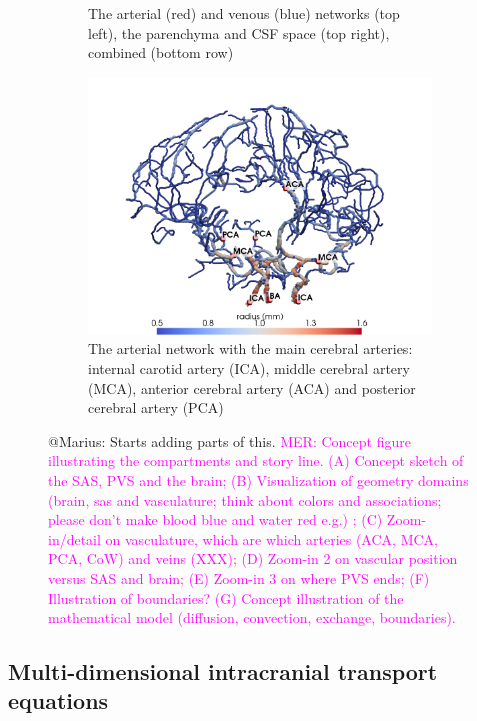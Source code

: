 \documentclass[fleqn,10pt]{wlscirep}
\newcommand{\mer}[1]{\textcolor{magenta}{#1}}
\begin{document}
\begin{figure}
\begin{subfigure}[b]{0.3\textwidth}
         \caption{The arterial (red) and venous (blue) networks (top left), the parenchyma and CSF space (top right), combined (bottom row)}
         \label{fig:three sin x}
     \end{subfigure}
     \hfill
     \begin{subfigure}[b]{0.24\textwidth}
         \centering
         \includegraphics[trim={4cm 0 4cm 0},clip,width=\textwidth]{figures/labeled_arteries.png}
         \caption{The arterial network with the main cerebral arteries: internal carotid artery (ICA), middle cerebral artery (MCA), anterior cerebral artery (ACA) and posterior cerebral artery (PCA)}
         \label{fig:five over x}
     \end{subfigure}
  \caption{@Marius: Starts adding parts of this. \mer{MER: Concept figure illustrating the compartments and story line. (A) Concept sketch of the SAS, PVS and the brain; (B) Visualization of geometry domains (brain, sas and vasculature; think about colors and associations; please don't make blood blue and water red e.g.) ; (C) Zoom-in/detail on vasculature, which are which arteries (ACA, MCA, PCA, CoW)  and veins (XXX); (D) Zoom-in 2 on vascular position versus SAS and brain; (E) Zoom-in 3 on where PVS ends; (F) Illustration of boundaries? (G) Concept illustration of the mathematical model (diffusion, convection, exchange, boundaries).}}
\label{fig:concept}
\end{figure}

\subsection*{Multi-dimensional intracranial transport equations}
\end{document}

